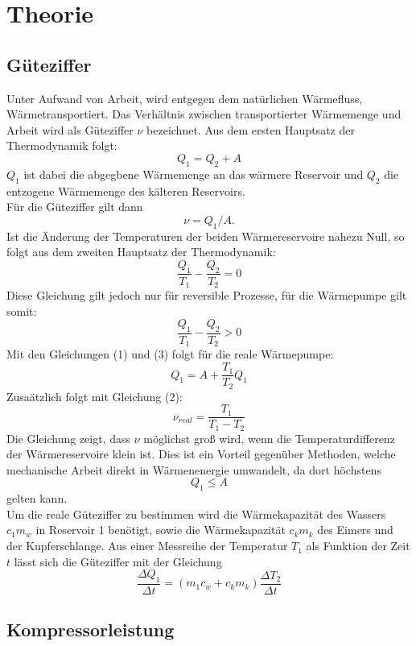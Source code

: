 \section{Theorie}
\subsection{Güteziffer}
Unter Aufwand von Arbeit, wird entgegen dem natürlichen Wärmefluss, Wärmetransportiert.
Das Verhältnis zwischen transportierter Wärmemenge und Arbeit wird als Güteziffer $\nu$
bezeichnet. Aus dem ersten Hauptsatz der Thermodynamik folgt:
\begin{equation}
  Q_1 = Q_2 + A
\end{equation}
$Q_1$ ist dabei die abgegbene Wärmemenge an das wärmere Reservoir und $Q_2$ die
entzogene Wärmemenge des kälteren Reservoirs. \\
Für die Güteziffer gilt dann
\begin{equation}
  \nu = Q_1 / A .
\end{equation}
Ist die Änderung der Temperaturen der beiden Wärmereservoire nahezu Null, so folgt
aus dem zweiten Hauptsatz der Thermodynamik:
\begin{equation}
  \frac{Q_1}{T_1} - \frac{Q_2}{T_2} = 0
\end{equation}
Diese Gleichung gilt jedoch nur für reversible Prozesse, für die Wärmepumpe gilt somit:
\begin{equation}
  \frac{Q_1}{T_1} - \frac{Q_2}{T_2} > 0
\end{equation}
Mit den Gleichungen (1) und (3) folgt für die reale Wärmepumpe:
\begin{equation}
  Q_1 = A + \frac{T_1}{T_2}Q_1
\end{equation}
Zusaätzlich folgt mit Gleichung (2):
\begin{equation}
  \nu_{real} = \frac{T_1}{T_1 - T_2}
\end{equation}
Die Gleichung zeigt, dass $\nu$ möglichst groß wird, wenn die Temperaturdifferenz
der Wärmereservoire klein ist. Dies ist ein Vorteil gegenüber Methoden, welche
mechanische Arbeit direkt in Wärmenenergie umwandelt, da dort höchstens
\begin{equation}
  Q_1 \leq A
\end{equation}
gelten kann. \\
Um die reale Güteziffer zu bestimmen wird die Wärmekapazität des Wassers $c_1m_w$ in Reservoir 1 benötigt,
sowie die Wärmekapazität $c_km_k$ des Eimers und der Kupferschlange. Aus einer Messreihe der Temperatur
$T_1$ als Funktion der Zeit $t$ lässt sich die Güteziffer mit der Gleichung
\begin{equation}
  \frac{\Delta Q_1}{\Delta t} = (m_1 c_w+ c_k m_k) \frac{\Delta T_2}{\Delta t}
\end{equation}
\subsection{Kompressorleistung}

\label{sec:Theorie}

\cite{sample}
